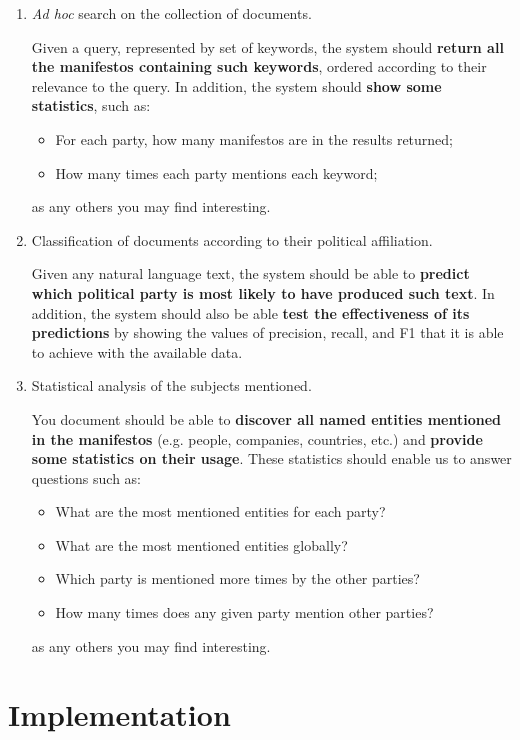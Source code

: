 \documentclass[12pt]{article}
\begin{document}
\begin{enumerate}
\item \textit{Ad hoc} search on the collection of documents.

    Given a query, represented by set of keywords, the system should
    \textbf{return all the manifestos containing such keywords}, ordered
    according to their relevance to the query. In addition, the system should
    \textbf{show some statistics}, such as:
    \begin{itemize}
    \item For each party, how many manifestos are in the results returned;
    \item How many times each party mentions each keyword;
    \end{itemize} as any others you may find interesting.

\item Classification of documents according to their political affiliation.

    Given any natural language text, the system should be able to
    \textbf{predict which political party is most likely to have produced such
      text}. In addition, the system should also be able \textbf{test the
      effectiveness of its predictions} by showing the values of precision,
    recall, and F1 that it is able to achieve with the available data.

\item Statistical analysis of the subjects mentioned.

    You document should be able to \textbf{discover all named entities
      mentioned in the manifestos} (e.g. people, companies, countries, etc.)
    and \textbf{provide some statistics on their usage}. These statistics
    should enable us to answer questions such as:
    \begin{itemize}
    \item What are the most mentioned entities for each party?
    \item What are the most mentioned entities globally?
    \item Which party is mentioned more times by the other parties?
    \item How many times does any given party mention other parties?
    \end{itemize} as any others you may find interesting.

\end{enumerate}


\section{Implementation}
\label{sec:implementation}
\end{document}
